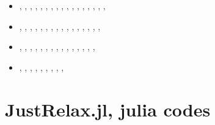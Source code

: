 \begin{small}
\begin{itemize}
                               \textcite{pazs22},  \textcite{bagm22}
\item[\twothousandtwentythree] \textcite{wulq23},  \textcite{zhli23}, \textcite{palb23},
                               \textcite{ankm23},  \textcite{pezg23}, \textcite{izhy23},
                               \textcite{bogj23},  \textcite{lige23}, \textcite{stgc23},
                               \textcite{chzl23},  \textcite{walh23}, \textcite{yams23},
                               \textcite{xumm23},  \textcite{guyg23}, \textcite{sayb23},
                               \textcite{fava23},  \textcite{xicy23}, \textcite{kekg23}
\item[\twothousandtwentyfour]  \textcite{xicc24},  \textcite{fuli24}, \textcite{chzy24},
                               \textcite{sihf24},  \textcite{qicz24}, \textcite{qilb24},
                               \textcite{orbg24},  \textcite{ficd24}, \textcite{magp24},
                               \textcite{xibg24},  \textcite{xicm24}, \textcite{yacz24},
                               \textcite{makb24},  \textcite{culi24}, \textcite{zhhz24},
                               \textcite{erpz24},  \textcite{zapg24}
\item[\twothousandtwentyfive]  \textcite{masg25},  \textcite{pezg25}, \textcite{ligr25},
                               \textcite{mabg25},  \textcite{cagm25}, \textcite{devf25},
                               \textcite{gugs25},  \textcite{orgb25}, \textcite{orbg25},
                               \textcite{pezg25b}, \textcite{gema25}, \textcite{gobg25},
                               \textcite{xuzg25},  \textcite{stpg25}, \textcite{bagt25},
                               \textcite{zhbg25}
\item[2026]                    \textcite{yalp26},  \textcite{sull26}, \textcite{sulb26},
                               \textcite{zhdg26},  \textcite{gocb26}, \textcite{ligl26},
                               \textcite{maab26},  \textcite{yagg26}, \textcite{vabw26},
                               \textcite{yuxk26}
\end{itemize}
\end{small}




\section{JustRelax.jl, julia codes}

